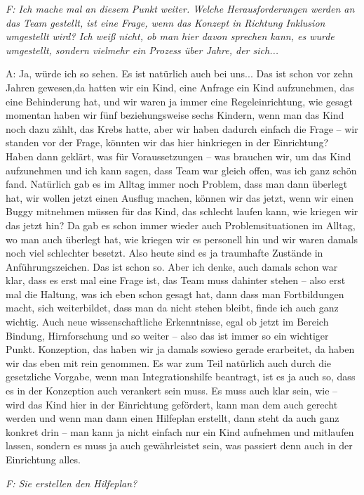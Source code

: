 \emph{F: Ich mache mal an diesem Punkt weiter. Welche Herausforderungen werden an das Team gestellt, ist eine Frage, wenn das Konzept in Richtung Inklusion umgestellt wird? Ich weiß nicht, ob man hier davon sprechen kann, es wurde umgestellt, sondern vielmehr ein Prozess über Jahre, der sich...}

A: Ja, würde ich so sehen. Es ist natürlich auch bei uns... Das ist schon vor zehn Jahren gewesen,da hatten wir ein Kind, eine Anfrage ein Kind aufzunehmen, das eine Behinderung hat, und wir waren ja immer eine Regeleinrichtung, wie gesagt momentan haben wir fünf beziehungsweise sechs Kindern, wenn man das Kind noch dazu zählt, das Krebs hatte, aber wir haben dadurch einfach die Frage -- wir standen vor der Frage, könnten wir das hier hinkriegen in der Einrichtung? Haben dann geklärt, was für Voraussetzungen -- was brauchen wir, um das Kind aufzunehmen und ich kann sagen, dass Team war gleich offen, was ich ganz schön fand. Natürlich gab es im Alltag immer noch Problem, dass man dann überlegt hat, wir wollen jetzt einen Ausflug machen, können wir das jetzt, wenn wir einen Buggy mitnehmen müssen für das Kind, das schlecht laufen kann, wie kriegen wir das jetzt hin? Da gab es schon immer wieder auch Problemsituationen im Alltag, wo man auch überlegt hat, wie kriegen wir es personell hin und wir waren damals noch viel schlechter besetzt. Also heute sind es ja traumhafte Zustände in Anführungszeichen. Das ist schon so. Aber ich denke, auch damals schon war klar, dass es erst mal eine Frage ist, das Team muss dahinter stehen -- also erst mal die Haltung, was ich eben schon gesagt hat, dann dass man Fortbildungen macht, sich weiterbildet, dass man da nicht stehen bleibt, finde ich auch ganz wichtig. Auch neue wissenschaftliche Erkenntnisse, egal ob jetzt im Bereich Bindung, Hirnforschung und so weiter -- also das ist immer so ein wichtiger Punkt. Konzeption, das haben wir ja damals sowieso gerade erarbeitet, da haben wir das eben mit rein genommen. Es war zum Teil natürlich auch durch die gesetzliche Vorgabe, wenn man Integrationshilfe beantragt, ist es ja auch so, dass es in der Konzeption auch verankert sein muss. Es muss auch klar sein, wie -- wird das Kind hier in der Einrichtung gefördert, kann man dem auch gerecht werden und wenn man dann einen Hilfeplan erstellt, dann steht da auch ganz konkret drin --  man kann ja nicht einfach nur ein Kind aufnehmen und mitlaufen lassen, sondern es muss ja auch gewährleistet sein, was passiert denn auch in der Einrichtung alles. 

\emph{F: Sie erstellen den Hilfeplan?} 

